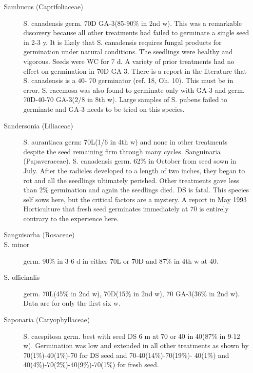 \begin{description}
\item[Sambucus (Caprifoliaceae)] S. canadensis germ. 70D GA-3(85-90\% in
2nd w). This was a remarkable discovery because all other treatments had failed to
germinate a single seed in 2-3 y. It is likely that S. canadensis requires fungal
products for germination under natural conditions. The seedlings were healthy and
vigorous. Seeds were WC for 7 d. A variety of prior treatments had no effect on
germination in 70D GA-3. There is a report in the literature that S. canadensis is a 40-
70 germinator (ref. 18, Oh. 10). This must be in error. S. racemosa was also found to
germinate only with GA-3 and germ. 70D-40-70 GA-3(2/8 in 8th w). Large samples of
S. pubens failed to germinate and GA-3 needs to be tried on this species.

\item[Sandersonia (Liliaceae)] S. aurantiaca germ: 70L(1/6 in 4th w) and none
in other treatments despite the seed remaining firm through many cycles.
Sanguinaria (Papaveraceae). S. canadensis germ. 62\% in October from
seed sown in July. After the radicles developed to a length of two inches, they began
to rot and all the seedlings ultimately perished. Other treatments gave less than 2\%
germination and again the seedlings died. DS is fatal. This species self sows here,
but the critical factors are a mystery. A report in May 1993 Horticulture that fresh seed
germinates immediately at 70 is entirely contrary to the experience here.
\item[Sanguisorba (Rosaceae)]
\item[S. minor] germ. 90\% in 3-6 d in either 70L or 70D and 87\% in 4th w at 40.
\item[S. officinalis] germ. 70L(45\% in 2nd w), 70D(15\% in 2nd w), 70 GA-3(36\% in
2nd w). Data are for only the first six w.
\item[Saponaria (Caryophyllaceae)] S. caespitosa germ. best with seed DS 6 m
at 70 or 40 in 40(87\% in 9-12 w). Germination was low and extended in all other
treatments as shown by 70(1\%)-40(1\%)-70 for DS seed and 70-40(14\%)-70(19\%)-
40(1\%) and 40(4\%)-70(2\%)-40(9\%)-70(1\%) for fresh seed.


\end{description}
